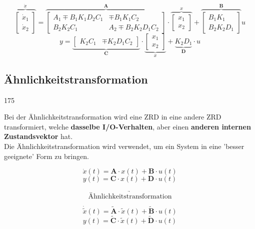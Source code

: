 \smallskip

$$
\overbrace{ \begin{bmatrix} \dot{x}_1 \\ \dot{x}_2 \end{bmatrix} }^{\dot{x}}
=
\overbrace{
\begin{bmatrix}
    A_1 \mp B_1 K_1 D_2 C_1 & \mp B_1 K_1 C_2           \\
    B_2 K_2 C_1             & A_2 \mp B_2 K_2 D_1 C_2
\end{bmatrix}}^{\bm{A}}
\cdot 
\overbrace{ \begin{bmatrix} x_1 \\ x_2 \end{bmatrix} }^{x}
+
\overbrace{
\begin{bmatrix} B_1 K_1 \\ B_2 K_2 D_1 \end{bmatrix} }^{\bm{B}} u
$$
$$
y =
\underbrace{ \begin{bmatrix} K_2 C_1 & \mp K_2 D_1 C_2 \end{bmatrix} }_{\bm{C}}
\cdot
\underbrace{ \begin{bmatrix} x_1 \\ x_2 \end{bmatrix} }_{x}
+
\underbrace{K_2 D_1}_{\bm{D}} \cdot u
$$

\columnbreak


\subsection{Ähnlichkeitstransformation}{175}
\label{Ähnlichkeitstransformation}


Bei der Ähnlichkeitstransformation wird eine ZRD in eine andere ZRD transformiert,
welche \textbf{dasselbe I/O-Verhalten}, aber einen \textbf{anderen internen Zustandsvektor} hat. \\
Die Ähnlichkeitstransformation wird verwendet, um ein System in eine 'besser geeignete' Form zu bringen.

\vspace{-0.2cm}

\begin{minipage}[c]{0.3\columnwidth}
    $$ \dot{x}(t) =\bm{A} \cdot x(t) + \bm{B} \cdot u(t) $$
    $$ y(t) =\bm{C} \cdot x(t) + \bm{D} \cdot u(t) $$
\end{minipage}
\hfill
\begin{minipage}[c]{0.38\columnwidth}
    $$ \underrightarrow{\text{Ähnlichkeitstransformation}} $$
\end{minipage}
\hfill
\begin{minipage}[c]{0.3\columnwidth}
    $$ \dot{\tilde{x}}(t) =\bm{\tilde{A}} \cdot \tilde{x}(t) + \bm{\tilde{B}} \cdot u(t) $$
    $$ y(t) =\bm{\tilde{C}} \cdot \tilde{x}(t) + \bm{\tilde{D}} \cdot u(t) $$
\end{minipage}

